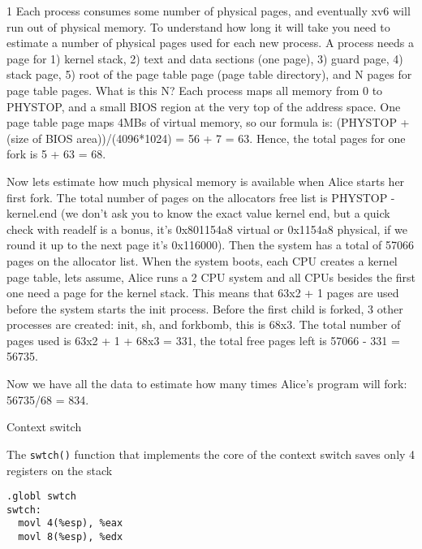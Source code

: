 \documentclass[11pt]{exam}
\def\answers{1}
\begin{document}
\begin{questions}
\begin{parts}
\if\answers1
Each process consumes some number of physical pages, and eventually xv6 will run out of physical memory. To understand 
	how long it will take you need to estimate a number of physical pages used for each new process. A process needs a page for 1) kernel stack, 2) text and data sections (one page), 
	3) guard page, 4) stack page, 5) root of the page table page (page table directory), and N pages for page table pages. 
	What is this N? Each process maps all memory from 0 to PHYSTOP, and a small BIOS region at the very top of the 
	address space. One page table page maps 4MBs of virtual memory, so our formula is: (PHYSTOP + (size of BIOS area))/(4096*1024) = 56 + 7 = 63. Hence, the total 
	pages for one fork is 5 + 63 = 68. 

	Now lets estimate how much physical memory is available when Alice starts her first fork. The total number of pages on the allocators free list is PHYSTOP - kernel.end (we 
	don't ask you to know the exact value kernel end, but a quick check with readelf is a bonus, it's 0x801154a8 virtual or 0x1154a8 physical, if we round it up to the next page it's 
	0x116000). Then the system has a total of 57066 pages on the allocator list. When the system boots, each CPU creates a kernel page table, lets assume, Alice runs a 2 CPU system and 
	all CPUs besides the first one need a page for the kernel stack. This means that 63x2 + 1 pages are used before the system starts the init process. Before the first child is forked, 
	3 other processes are created: init, sh, and forkbomb, this is 68x3. The total number of pages used is 63x2 + 1 + 68x3 = 331, the total free pages left is 57066 - 331 = 56735. 

	Now we have all the data to estimate how many times Alice's program will fork: 56735/68 = 834.

\iffalse
\begin{verbatim}
forked pid:811
forked pid:812
fork failed, pid:-1
\end{verbatim}
\fi
\fi

\vfill

\end{parts}


\newpage

\addpoints
\question Context switch

The \texttt{swtch()} function that implements the core of the context switch 
saves only 4 registers on the stack

\begin{verbatim}
.globl swtch
swtch:
  movl 4(%esp), %eax
  movl 8(%esp), %edx


\end{verbatim}
\end{questions}
\end{document}

